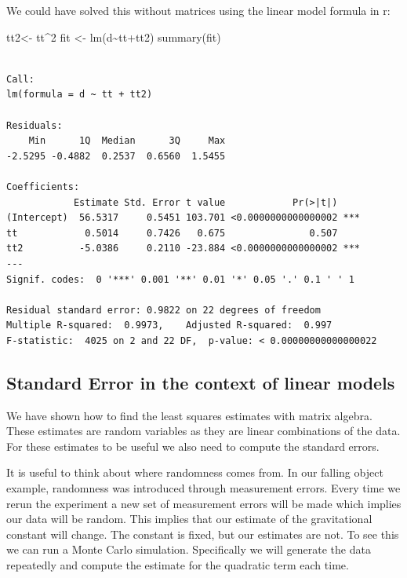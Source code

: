 \documentclass[
  letterpaper,
  DIV=11,
  numbers=noendperiod]{scrartcl}
\newenvironment{Shaded}{\begin{snugshade}}{\end{snugshade}}
\newcommand{\DecValTok}[1]{\textcolor[rgb]{0.68,0.00,0.00}{#1}}
\newcommand{\FunctionTok}[1]{\textcolor[rgb]{0.28,0.35,0.67}{#1}}
\newcommand{\NormalTok}[1]{\textcolor[rgb]{0.00,0.23,0.31}{#1}}
\newcommand{\OtherTok}[1]{\textcolor[rgb]{0.00,0.23,0.31}{#1}}
\newcommand{\SpecialCharTok}[1]{\textcolor[rgb]{0.37,0.37,0.37}{#1}}
\begin{document}
We could have solved this without matrices using the linear model
formula in r:

\begin{Shaded}
\begin{Highlighting}[]
\NormalTok{tt2}\OtherTok{\textless{}{-}}\NormalTok{ tt}\SpecialCharTok{\^{}}\DecValTok{2}
\NormalTok{fit }\OtherTok{\textless{}{-}} \FunctionTok{lm}\NormalTok{(d}\SpecialCharTok{\textasciitilde{}}\NormalTok{tt}\SpecialCharTok{+}\NormalTok{tt2)}
\FunctionTok{summary}\NormalTok{(fit)}
\end{Highlighting}
\end{Shaded}

\begin{verbatim}

Call:
lm(formula = d ~ tt + tt2)

Residuals:
    Min      1Q  Median      3Q     Max 
-2.5295 -0.4882  0.2537  0.6560  1.5455 

Coefficients:
            Estimate Std. Error t value            Pr(>|t|)    
(Intercept)  56.5317     0.5451 103.701 <0.0000000000000002 ***
tt            0.5014     0.7426   0.675               0.507    
tt2          -5.0386     0.2110 -23.884 <0.0000000000000002 ***
---
Signif. codes:  0 '***' 0.001 '**' 0.01 '*' 0.05 '.' 0.1 ' ' 1

Residual standard error: 0.9822 on 22 degrees of freedom
Multiple R-squared:  0.9973,    Adjusted R-squared:  0.997 
F-statistic:  4025 on 2 and 22 DF,  p-value: < 0.00000000000000022
\end{verbatim}

\subsection{Standard Error in the context of linear
models}\label{standard-error-in-the-context-of-linear-models}

We have shown how to find the least squares estimates with matrix
algebra. These estimates are random variables as they are linear
combinations of the data. For these estimates to be useful we also need
to compute the standard errors.

It is useful to think about where randomness comes from. In our falling
object example, randomness was introduced through measurement errors.
Every time we rerun the experiment a new set of measurement errors will
be made which implies our data will be random. This implies that our
estimate of the gravitational constant will change. The constant is
fixed, but our estimates are not. To see this we can run a Monte Carlo
simulation. Specifically we will generate the data repeatedly and
compute the estimate for the quadratic term each time.
\end{document}
